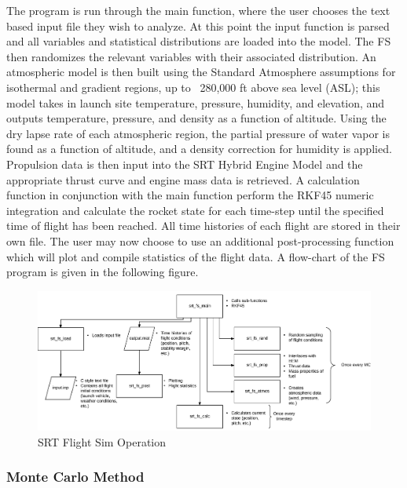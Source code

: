 \documentclass[10pt,a4paper]{article}
\begin{document}
The program is run through the main function, where the user chooses the text based input file they wish to analyze. At this point the input function is parsed and all variables and statistical distributions are loaded into the model. The FS then randomizes the relevant variables with their associated distribution. An atmospheric model is then built using the Standard Atmosphere assumptions for isothermal and gradient regions, up to ~280,000 ft above sea level (ASL); this model takes in launch site temperature, pressure, humidity, and elevation, and outputs temperature, pressure, and density as a function of altitude. Using the dry lapse rate of each atmospheric region, the partial pressure of water vapor is found as a function of altitude, and a density correction for humidity is applied. Propulsion data is then input into the SRT Hybrid Engine Model and the appropriate thrust curve and engine mass data is retrieved. A calculation function in conjunction with the main function perform the RKF45 numeric integration and calculate the rocket state for each time-step until the specified time of flight has been reached. All time histories of each flight are stored in their own file. The user may now choose to use an additional post-processing function which will plot and compile statistics of the flight data. A flow-chart of the FS program is given in the following figure.
\begin{figure}[h!]
	\centering
	\includegraphics[width=1.05\textwidth]{./figs/fs_flow.png}
	\caption{SRT Flight Sim Operation}
	\label{fig:fs_flow}
\end{figure}


\subsubsection{Monte Carlo Method}
\end{document}
